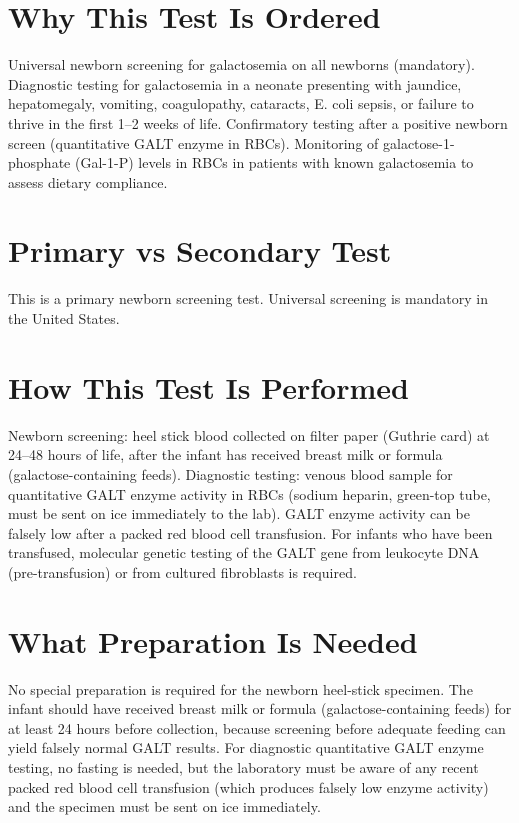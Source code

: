 \section*{Why This Test Is Ordered}
Universal newborn screening for galactosemia on all newborns (mandatory). Diagnostic testing for galactosemia in a neonate presenting with jaundice, hepatomegaly, vomiting, coagulopathy, cataracts, E. coli sepsis, or failure to thrive in the first 1--2 weeks of life. Confirmatory testing after a positive newborn screen (quantitative GALT enzyme in RBCs). Monitoring of galactose-1-phosphate (Gal-1-P) levels in RBCs in patients with known galactosemia to assess dietary compliance.

\section*{Primary vs Secondary Test}
This is a primary newborn screening test. Universal screening is mandatory in the United States.

\section*{How This Test Is Performed}
Newborn screening: heel stick blood collected on filter paper (Guthrie card) at 24--48 hours of life, after the infant has received breast milk or formula (galactose-containing feeds). Diagnostic testing: venous blood sample for quantitative GALT enzyme activity in RBCs (sodium heparin, green-top tube, must be sent on ice immediately to the lab). GALT enzyme activity can be falsely low after a packed red blood cell transfusion. For infants who have been transfused, molecular genetic testing of the GALT gene from leukocyte DNA (pre-transfusion) or from cultured fibroblasts is required.

\section*{What Preparation Is Needed}
No special preparation is required for the newborn heel-stick specimen. The infant should have received breast milk or formula (galactose-containing feeds) for at least 24 hours before collection, because screening before adequate feeding can yield falsely normal GALT results. For diagnostic quantitative GALT enzyme testing, no fasting is needed, but the laboratory must be aware of any recent packed red blood cell transfusion (which produces falsely low enzyme activity) and the specimen must be sent on ice immediately.

